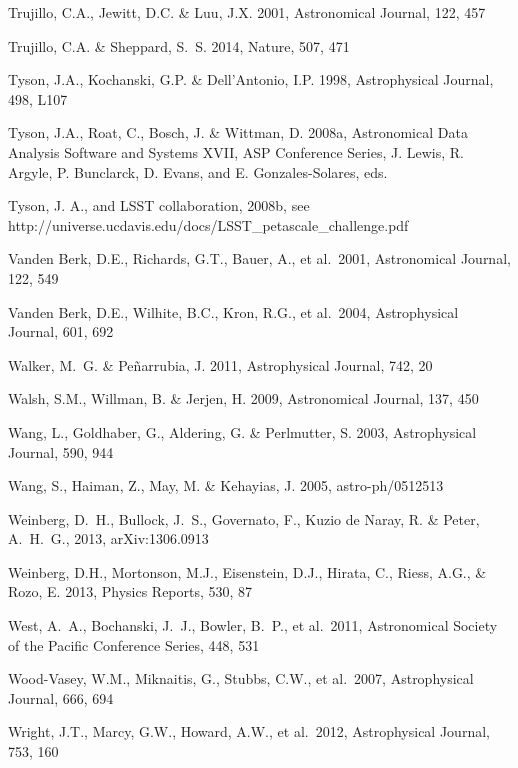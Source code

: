 \documentclass{emulateapj}
\begin{document}
\begin{thebibliography}{}
\bibitem[()]{} Trujillo, C.A., Jewitt, D.C. \& Luu, J.X. 2001, Astronomical Journal, 122, 457

\bibitem[()]{} Trujillo, C.A. \& Sheppard, S.~S. 2014, Nature, 507, 471

\bibitem[()]{} Tyson, J.A., Kochanski, G.P. \& Dell'Antonio, I.P. 1998, Astrophysical Journal, 498, L107

\bibitem[()]{} Tyson, J.A., Roat, C., Bosch, J. \& Wittman, D. 2008a, Astronomical 
             Data Analysis Software and Systems XVII, ASP Conference Series, 
             J. Lewis, R. Argyle, P. Bunclarck, D. Evans, and E. Gonzales-Solares, eds.     

\bibitem[()]{} Tyson, J. A., and LSST collaboration, 2008b, see 
                 http://universe.ucdavis.edu/docs/LSST\_petascale\_challenge.pdf 

\bibitem[()]{} Vanden Berk, D.E., Richards, G.T., Bauer, A., et al.~2001, Astronomical Journal, 122, 549

\bibitem[()]{} Vanden Berk, D.E., Wilhite, B.C., Kron, R.G., et al.~2004, Astrophysical Journal, 601, 692

\bibitem[()]{} Walker, M.~G. \& Pe{\~n}arrubia, J. 2011, Astrophysical Journal, 742, 20


\bibitem[()]{} Walsh, S.M., Willman, B. \& Jerjen, H. 2009, Astronomical Journal, 137, 450

\bibitem[()]{} Wang, L., Goldhaber, G., Aldering, G. \& Perlmutter, S. 2003, Astrophysical Journal, 590, 944

\bibitem[()]{} Wang, S., Haiman, Z., May, M. \& Kehayias, J. 2005, astro-ph/0512513

\bibitem[()]{} Weinberg, D.~H., Bullock, J.~S., Governato, F., Kuzio de Naray, R. \& Peter, A.~H.~G., 2013, arXiv:1306.0913

\bibitem[()]{} Weinberg, D.H., Mortonson, M.J., Eisenstein, D.J.,
  Hirata, C., Riess, A.G., \& Rozo, E. 2013, Physics Reports, 530, 87

\bibitem[()]{} West, A.~A., Bochanski, J.~J., Bowler, B.~P., et al.~2011, Astronomical Society of the Pacific 
                  Conference Series, 448, 531

\bibitem[()]{} Wood-Vasey, W.M., Miknaitis, G., Stubbs, C.W., et al.~2007, Astrophysical Journal, 666, 694 

\bibitem[()]{} Wright, J.T., Marcy, G.W., Howard, A.W., et al.~2012, Astrophysical Journal, 753, 160


\end{thebibliography}
\end{document}
